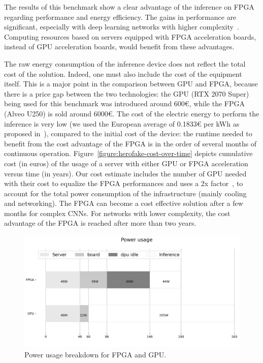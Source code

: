 The results of this benchmark show a clear advantage of the inference on FPGA regarding performance and energy efficiency. The gains in performance are significant, especially with deep learning networks with higher complexity~\cite{8782524}. Computing resources based on servers equipped with FPGA acceleration boards, instead of GPU acceleration boards, would benefit from these advantages.

The raw energy consumption of the inference device does not reflect the total cost of the solution. Indeed, one must also include the cost of the equipment itself. This is a major point in the comparison between GPU and FPGA, because there is a price gap between the two technologies: the GPU (RTX 2070 Super) being used for this benchmark was introduced around 600€, while the FPGA (Alveo U250) is sold around 6000€. The cost of the electric energy to perform the inference is very low (we used the European average of 0.1833€ per kWh as proposed in~\cite{energy-price}), compared to the initial cost of the device: the runtime needed to benefit from the cost advantage of the FPGA is in the order of several months of continuous operation. Figure~\ref{figure:herofake-cost-over-time} depicts cumulative cost (in euros) of the usage of a server with either GPU or FPGA acceleration versus time (in years). Our cost estimate includes the number of GPU needed with their cost to equalize the FPGA performances and uses a 2x factor~\cite{shehabiUnitedStatesData2016}, to account for the total power consumption of the infrastructure (mainly cooling and networking). The FPGA can become a cost effective solution after a few months for complex CNNs. For networks with lower complexity, the cost advantage of the FPGA is reached after more than two years.

\begin{figure}[t]
\centering
\includegraphics[width=\columnwidth]{5_Chapitre3/figures/characterization/power_usage.png}
\caption{Power usage breakdown for FPGA and GPU.}
\label{figure:herofake-power-usage}
\end{figure}

